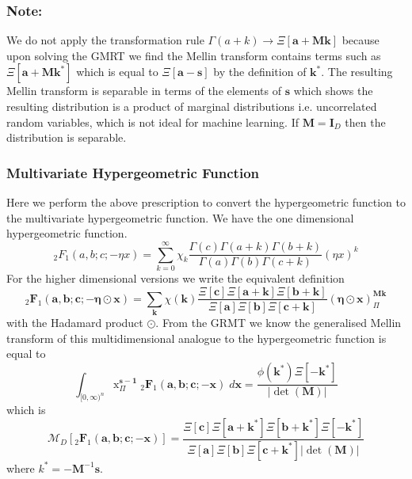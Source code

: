 \documentclass{article}
\begin{document}
\subsubsection{Note:}
We do not apply the transformation rule $\Gamma(a+k) \to \Xi[\mathbf{a} + \mathbf{Mk}]$ because upon solving the GMRT we find the Mellin transform contains terms such as $\Xi[\mathbf{a} + \mathbf{Mk^*}]$ which is equal to $\Xi[\mathbf{a} - \mathbf{s}]$ by the definition of $\mathbf{k}^*$. The resulting Mellin transform is separable in terms of the elements of $\mathbf{s}$ which shows the resulting distribution is a product of marginal distributions i.e. uncorrelated random variables, which is not ideal for machine learning. If $\mathbf{M}=\mathbf{I}_D$ then the distribution is separable.


\subsubsection{Multivariate Hypergeometric Function}
Here we perform the above prescription to convert the hypergeometric function to the multivariate hypergeometric function. We have the one dimensional hypergeometric function.
\begin{equation}
_2F_1(a,b;c;-\eta x) = \sum_{k=0}^\infty \chi_k \frac{\Gamma(c)\Gamma(a+k)\Gamma(b+k)}{\Gamma(a)\Gamma(b)\Gamma(c+k)} (\eta x)^k
\end{equation}
For the higher dimensional versions we write the equivalent definition
\begin{equation}
_2\mathbf{F}_1(\mathbf{a},\mathbf{b};\mathbf{c};-\boldsymbol\eta\odot\mathbf{x}) = \sum_{\mathbf{k}}\chi(\mathbf{k})\frac{\Xi[\mathbf{c}]\Xi[\mathbf{a}+\mathbf{k}]\Xi[\mathbf{b}+\mathbf{k}]}{\Xi[\mathbf{a}]\Xi[\mathbf{b}]\Xi[\mathbf{c}+\mathbf{k}]}{(\boldsymbol\eta\odot\mathbf{x})}^{\mathbf{M}\mathbf{k}}_\Pi
\end{equation}
with the Hadamard product $\odot$. From the GRMT we know the generalised Mellin transform of this multidimensional analogue to the hypergeometric function is equal to
\begin{equation}
\int_{[0,\infty)^n}\mathrm{x}^{\mathbf{s-1}}_\Pi\;_2\mathbf{F}_1(\mathbf{a},\mathbf{b};\mathbf{c};-\mathbf{x})\; d\mathbf{x} = \frac{\phi(\mathbf{k}^*)\Xi[-\mathbf{k}^*]}{|\det(\mathbf{M})|}
\end{equation}
which is
\begin{equation}
\mathcal{M}_D[_2\mathbf{F}_1(\mathbf{a},\mathbf{b};\mathbf{c};-\mathbf{x})] = \frac{\Xi[\mathbf{c}]\Xi[\mathbf{a}+\mathbf{k}^*]\Xi[\mathbf{b}+\mathbf{k}^*]\Xi[-\mathbf{k}^*]}{\Xi[\mathbf{a}]\Xi[\mathbf{b}]\Xi[\mathbf{c}+\mathbf{k}^*]|\det(\mathbf{M})|}
\end{equation}
where $k^* = -\mathbf{M}^{-1}\mathbf{s}$.










{}

\end{document}
